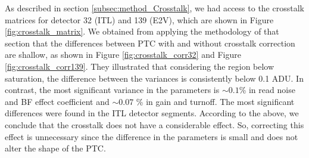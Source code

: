\vspace{3mm}

As described in section \ref{subsec:method_Crosstalk}, we had access to the crosstalk matrices for detector 32 (ITL) and 139 (E2V), which are shown in Figure \ref{fig:crosstalk_matrix}. We obtained from applying the methodology of that section that the differences between PTC with and without crosstalk correction are shallow, as shown in Figure \ref{fig:crosstalk_corr32} and Figure \ref{fig:crosstalk_corr139}. They illustrated that considering the region below saturation, the difference between the variances is consistently below 0.1 ADU. In contrast, the most significant variance in the parameters is $\sim 0.1$\% in read noise and BF effect coefficient and  $\sim 0.07$ \% in gain and turnoff. The most significant differences were found in the ITL detector segments. According to the above, we conclude that the crosstalk does not have a considerable effect. So, correcting this effect is unnecessary since the difference in the parameters is small and does not alter the shape of the PTC.  




